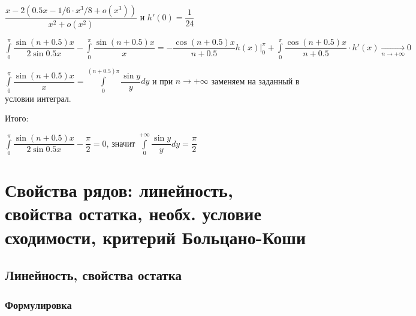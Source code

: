 \documentclass{article}
\begin{document}
            $\dfrac{x - 2 \left(0.5 x - 1/6 \cdot x^3/8 + o(x^3) \right)}{x^2 + o(x^2)}$ и $h'(0) = \dfrac{1}{24}$
            
            $\int\limits^{\pi}_0 \dfrac{\sin{(n + 0.5)x}}{2 \sin{0.5 x}} - \int\limits^{\pi}_0 \dfrac{\sin {(n + 0.5)x}}{x} = - \dfrac{\cos {(n + 0.5)x}}{n + 0.5} h(x) \bigg|^{\pi}_0 + \int\limits^{\pi}_0 \dfrac{\cos{(n + 0.5)}x}{n + 0.5} \cdot h'(x) \xrightarrow[n \rightarrow +\infty]{} 0$
            
            $\int\limits^{\pi}_0 \dfrac{\sin{(n + 0.5)}x}{x} = \int\limits^{(n + 0.5) \pi}_0 \dfrac{\sin{y}}{y} dy$ и при $n \rightarrow +\infty$ заменяем на заданный в условии интеграл. 
            
            Итого:
            
            $\int\limits^{\pi}_0 \dfrac{\sin {(n + 0.5)x}}{2 \sin 0.5 x} - \dfrac{\pi}{2} = 0$, значит $\int\limits^{+\infty}_0 \dfrac{\sin{y}}{y} dy = \dfrac{\pi}{2}$
            
    \newpage
    
    \section{Свойства рядов: линейность, свойства остатка, необх. условие сходимости, критерий Больцано-Коши}
    
        \subsection{Линейность, свойства остатка}
        
            \subsubsection{Формулировка}
            
\end{document}
